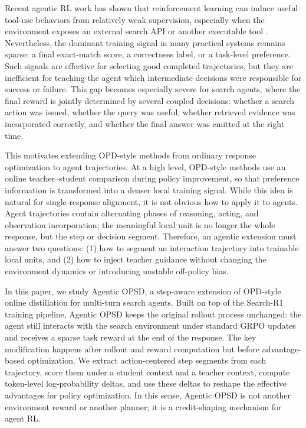 \documentclass[11pt]{article}
\newcommand{\method}{Agentic OPSD}
\newcommand{\grpo}{GRPO}
\newcommand{\searchr}{Search-R1}
\begin{document}
Recent agentic RL work has shown that reinforcement learning can induce useful tool-use behaviors from relatively weak supervision, especially when the environment exposes an external search API or another executable tool \citep{jin2025search,jin2025empirical,yao2023react,schick2023toolformer}. Nevertheless, the dominant training signal in many practical systems remains sparse: a final exact-match score, a correctness label, or a task-level preference. Such signals are effective for selecting good completed trajectories, but they are inefficient for teaching the agent which intermediate decisions were responsible for success or failure. This gap becomes especially severe for search agents, where the final reward is jointly determined by several coupled decisions: whether a search action was issued, whether the query was useful, whether retrieved evidence was incorporated correctly, and whether the final answer was emitted at the right time.

This motivates extending OPD-style methods from ordinary response optimization to agent trajectories. At a high level, OPD-style methods use an online teacher--student comparison during policy improvement, so that preference information is transformed into a denser local training signal. While this idea is natural for single-response alignment, it is not obvious how to apply it to agents. Agent trajectories contain alternating phases of reasoning, acting, and observation incorporation; the meaningful local unit is no longer the whole response, but the step or decision segment. Therefore, an agentic extension must answer two questions: (1) how to segment an interaction trajectory into trainable local units, and (2) how to inject teacher guidance without changing the environment dynamics or introducing unstable off-policy bias.

In this paper, we study \method, a step-aware extension of OPD-style online distillation for multi-turn search agents. Built on top of the \searchr{} training pipeline, \method{} keeps the original rollout process unchanged: the agent still interacts with the search environment under standard \grpo{} updates and receives a sparse task reward at the end of the response. The key modification happens after rollout and reward computation but before advantage-based optimization. We extract action-centered step segments from each trajectory, score them under a student context and a teacher context, compute token-level log-probability deltas, and use these deltas to reshape the effective advantages for policy optimization. In this sense, \method{} is not another environment reward or another planner; it is a credit-shaping mechanism for agent RL.
\end{document}
